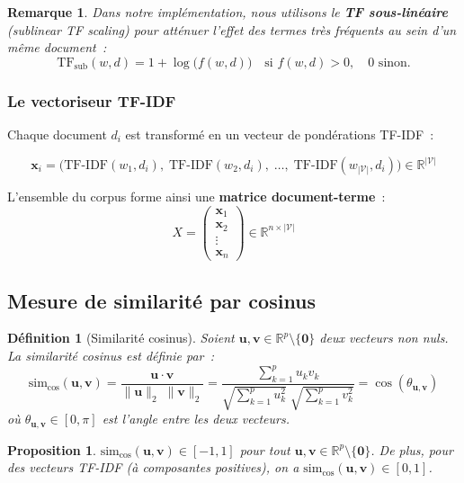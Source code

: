\documentclass[12pt, a4paper]{article}
\newtheorem{definition}{Définition}[section]
\newtheorem{proposition}{Proposition}[section]
\newtheorem{remark}{Remarque}[section]
\begin{document}
\begin{remark}
Dans notre implémentation, nous utilisons le \textbf{TF sous-linéaire} (\textit{sublinear TF scaling}) pour atténuer l'effet des termes très fréquents au sein d'un même document~:
\[
\mathrm{TF}_{\mathrm{sub}}(w, d) = 1 + \log\!\bigl(f(w, d)\bigr) \quad \text{si } f(w,d) > 0, \quad 0 \text{ sinon.}
\]
\end{remark}

\subsubsection{Le vectoriseur TF-IDF}

Chaque document $d_i$ est transformé en un vecteur de pondérations TF-IDF~:

\[
\mathbf{x}_i = \bigl(\mathrm{TF\text{-}IDF}(w_1, d_i),\; \mathrm{TF\text{-}IDF}(w_2, d_i),\; \ldots,\; \mathrm{TF\text{-}IDF}(w_{|\mathcal{V}|}, d_i)\bigr) \in \mathbb{R}^{|\mathcal{V}|}
\]

L'ensemble du corpus forme ainsi une \textbf{matrice document-terme}~:
\[
X = \begin{pmatrix} \mathbf{x}_1 \\ \mathbf{x}_2 \\ \vdots \\ \mathbf{x}_n \end{pmatrix} \in \mathbb{R}^{n \times |\mathcal{V}|}
\]

\subsection{Mesure de similarité par cosinus}

\begin{definition}[Similarité cosinus]
Soient $\mathbf{u}, \mathbf{v} \in \mathbb{R}^p \setminus \{\mathbf{0}\}$ deux vecteurs non nuls. La \emph{similarité cosinus} est définie par~:
\[
\boxed{
  \mathrm{sim}_{\cos}(\mathbf{u}, \mathbf{v})
  = \frac{\mathbf{u} \cdot \mathbf{v}}{\|\mathbf{u}\|_2 \; \|\mathbf{v}\|_2}
  = \frac{\displaystyle\sum_{k=1}^{p} u_k v_k}
         {\displaystyle\sqrt{\sum_{k=1}^{p} u_k^2}\;\sqrt{\sum_{k=1}^{p} v_k^2}}
  = \cos(\theta_{\mathbf{u},\mathbf{v}})
}
\]
où $\theta_{\mathbf{u},\mathbf{v}} \in [0, \pi]$ est l'angle entre les deux vecteurs.
\end{definition}

\begin{proposition}
$\mathrm{sim}_{\cos}(\mathbf{u}, \mathbf{v}) \in [-1, 1]$ pour tout $\mathbf{u}, \mathbf{v} \in \mathbb{R}^p \setminus \{\mathbf{0}\}$. De plus, pour des vecteurs TF-IDF (à composantes positives), on a $\mathrm{sim}_{\cos}(\mathbf{u}, \mathbf{v}) \in [0, 1]$.
\end{proposition}
\end{document}
